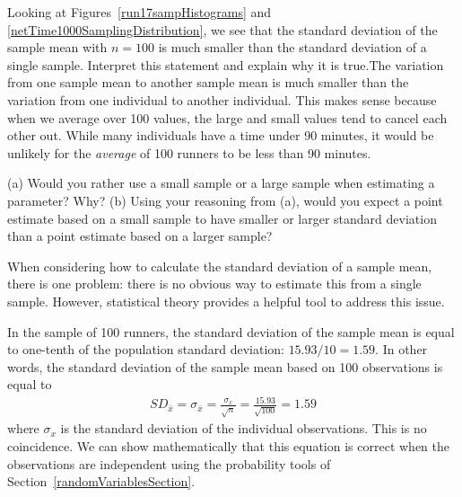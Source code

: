\begin{examplewrap}
\begin{nexample}{Looking at Figures~\ref{run17sampHistograms} and \ref{netTime1000SamplingDistribution}, we see that the standard deviation of the sample mean with $n=100$ is much smaller than the standard deviation of a single sample. Interpret this statement and explain why it is true.}The variation from one sample mean to another sample mean is much smaller than the variation from one individual to another individual. This makes sense because when we average over 100 values, the large and small values tend to cancel each other out. While many individuals have a time under 90 minutes, it would be unlikely for the \emph{average} of 100 runners to be less than 90 minutes.
\end{nexample}
\end{examplewrap}

\begin{exercisewrap}
\begin{nexercise}
(a) Would you rather use a small sample or a large sample when estimating a parameter? Why? (b) Using your reasoning from (a), would you expect a point estimate based on a small sample to have smaller or larger standard deviation than a point estimate based on a larger sample?\footnotemark
\end{nexercise}
\end{exercisewrap}

When considering how to calculate the standard deviation of a sample mean, there is one problem: there is no obvious way to estimate this from a single sample. However, statistical theory provides a helpful tool to address this issue.

In the sample of 100 runners, the standard deviation of the sample mean is equal to one-tenth of the population standard deviation: $15.93/10 = 1.59$. In other words, the standard deviation of the sample mean based on 100 observations is equal to
\begin{eqnarray*}
SD_{\bar{x}} = \sigma_{\bar{x}} = \frac{\sigma_{x}}{\sqrt{n}} = \frac{15.93}{\sqrt{100}} = 1.59
\end{eqnarray*}
where $\sigma_{x}$ is the standard deviation of the individual observations. This is no coincidence. We can show mathematically that this equation is correct when the observations are independent  using the probability tools of Section~\ref{randomVariablesSection}.

